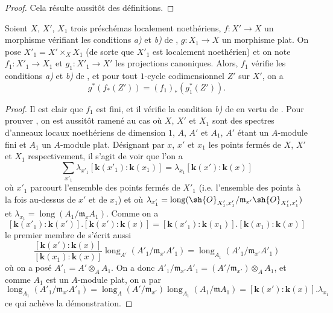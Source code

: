 \begin{proof}
Cela résulte aussitôt des définitions.
\end{proof}

\begin{proposition}[21.10.16]
\label{IV.21.10.16}
Soient $X$, $X'$, $X_1$ trois préschémas localement noethériens, $f:X'\to X$ un morphisme vérifiant les conditions \emph{a)} et \emph{b)} de , $g:X_1\to X$ un morphisme plat.
On pose $X'_1=X'\times_XX_1$ (de sorte que $X'_1$ est localement noethérien) et on note $f_1:X'_1\to X_1$ et $g_1:X'_1\to X'$ les projections canoniques.
Alors, $f_1$ vérifie les conditions \emph{a)} et \emph{b)} de , et pour tout $1$-cycle codimensionnel $Z'$ sur $X'$, on a
\[
\label{IV.21.10.16.1}
  g^*(f_*(Z'))=(f_1)_*(g_1^*(Z')).
  \tag{21.10.16.1}
\]
\end{proposition}

\begin{proof}
Il est clair que $f_1$ est fini, et il vérifie la condition \emph{b)} de  en vertu de .
Pour prouver , on est aussitôt ramené au cas où $X$, $X'$ et $X_1$ sont des spectres d'anneaux locaux noethériens de dimension $1$, $A$, $A'$ et $A_1$, $A'$ étant un $A$-module fini et $A_1$ un $A$-module plat.
Désignant par $x$, $x'$ et $x_1$ les points fermés de $X$, $X'$ et $X_1$ respectivement, il s'agit de voir que l'on a
\[
\label{IV.21.10.16.2}
  \sum_{x'_1}\lambda_{x'_1}[\boldsymbol{k}(x'_1):\boldsymbol{k}(x_1)]
  =\lambda_{x_1}[\boldsymbol{k}(x'):\boldsymbol{k}(x)]
  \tag{21.10.16.2}
\]
où $x'_1$ parcourt l'ensemble des points fermés de $X'_1$ (i.e. l'ensemble des points à la fois au-dessus de $x'$ et de $x_1$) et où $\lambda_{x'_1}=\operatorname{long}(\sh{O}_{X'_1,x'_1}/\mathfrak{m}_{x'}\sh{O}_{X'_1,x'_1})$ et $\lambda_{x_1}=\operatorname{long}(A_1/\mathfrak{m}_xA_1)$.
Comme on a
\[
  [\boldsymbol{k}(x'_1):\boldsymbol{k}(x')].[\boldsymbol{k}(x'):\boldsymbol{k}(x)]
  =[\boldsymbol{k}(x'_1):\boldsymbol{k}(x_1)].[\boldsymbol{k}(x_1):\boldsymbol{k}(x)]
\]
le premier membre de  s'écrit aussi
\[
  \frac{[\boldsymbol{k}(x'): \boldsymbol{k}(x)]}{[\boldsymbol{k}(x_1): \boldsymbol{k}(x)]}
  \operatorname{long}_{A'}(A'_1/\mathfrak{m}_{x'}A'_1)
  =\operatorname{long}_{A_1}(A'_1/\mathfrak{m}_{x'}A'_1)
\]
où on a posé $A'_1=A'\otimes_AA_1$.
On a donc $A'_1/\mathfrak{m}_{x'}A'_1=(A'/\mathfrak{m}_{x'})\otimes_AA_1$, et comme $A_1$ est un $A$-module plat, on a par 
\[
  \operatorname{long}_{A_1}(A'_1/\mathfrak{m}_{x'}A'_1)
  =\operatorname{long}_{A}(A'/\mathfrak{m}_{x'})\operatorname{long}_{A_1}(A_1/\mathfrak{m}A_1)
  =[\boldsymbol{k}(x'): \boldsymbol{k}(x)].\lambda_{x_1}
\]
ce qui achève la démonstration.
\end{proof}

